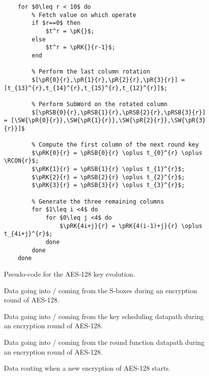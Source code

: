 \documentclass{scrartcl}
\begin{document}
\begin{figure}
    \begin{lstlisting}[frame=single]
    %%% Key evolution for each round key 
    for $0\leq r < 10$ do
        % Fetch value on which operate
        if $r==0$ then
            $t^r = \pK{}$; 
        else 
            $t^r = \pRK{}{r-1}$;
        end

        % Perform the last column rotation
        $[\pR{0}{r},\pR{1}{r},\pR{2}{r},\pR{3}{r}] = [t_{13}^{r},t_{14}^{r},t_{15}^{r},t_{12}^{r}]$; 

        % Perform SubWord on the rotated column
        $[\pRSB{0}{r},\pRSB{1}{r},\pRSB{2}{r},\pRSB{3}{r}] = [\SW{\pR{0}{r}},\SW{\pR{1}{r}},\SW{\pR{2}{r}},\SW{\pR{3}{r}}]$

        % Compute the first column of the next round key
        $\pRK{0}{r} = \pRSB{0}{r} \oplus t_{0}^{r} \oplus \RCON{r}$;
        $\pRK{1}{r} = \pRSB{1}{r} \oplus t_{1}^{r}$;
        $\pRK{2}{r} = \pRSB{2}{r} \oplus t_{2}^{r}$;
        $\pRK{3}{r} = \pRSB{3}{r} \oplus t_{3}^{r}$;

        % Generate the three remaining columns
        for $1\leq i <4$ do
            for $0\leq j <4$ do
                $\pRK{4i+j}{r} = \pRK{4(i-1)+j}{r} \oplus t_{4i+j}^{r}$;
            done
        done
    done
    \end{lstlisting}
    \caption{Pseudo-code for the AES-128 key evolution.}
    \label{fig:code_key}
\end{figure}

\begin{figure}
    \centering
    
    \caption{Data going into / coming from the S-boxes during an encryption round of AES-128.}
    \label{fig:pipe_sbox}
\end{figure}


\begin{figure}
    \centering
    
    \caption{Data going into / coming from the key scheduling datapath during an encryption round of AES-128.}
    \label{fig:pipe_dpkey}
\end{figure}

\begin{figure}
    \centering
    
    \caption{Data going into / coming from the round function datapath during an encryption round of AES-128.}
    \label{fig:pipe_dpstate}
\end{figure}


\begin{figure}
    \centering
     
    \caption{Data routing when a new encryption of AES-128 starts.}
    \label{fig:time_first_round}
\end{figure}
\end{document}
